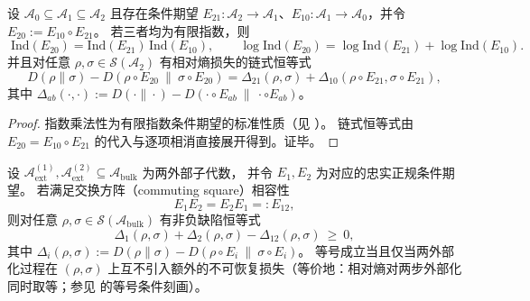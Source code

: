 

\begin{corollary}\label{cor:dephys-index-chain-rule}
设 \(\mathcal{A}_0\subseteq \mathcal{A}_1\subseteq \mathcal{A}_2\) 且存在条件期望
\(
E_{21}:\mathcal{A}_2\to\mathcal{A}_1
\)、\(
E_{10}:\mathcal{A}_1\to\mathcal{A}_0
\)，并令 \(E_{20}:=E_{10}\circ E_{21}\)。
若三者均为有限指数，则
\[
\boxed{\;
\mathrm{Ind}(E_{20})=\mathrm{Ind}(E_{21})\,\mathrm{Ind}(E_{10}),\qquad
\log\mathrm{Ind}(E_{20})=\log\mathrm{Ind}(E_{21})+\log\mathrm{Ind}(E_{10}).\;}
\]
并且对任意 \(\rho,\sigma\in\mathcal{S}(\mathcal{A}_2)\) 有相对熵损失的链式恒等式
\[
\boxed{\;
D(\rho\|\sigma)-D(\rho\circ E_{20}\ \|\ \sigma\circ E_{20})
=\Delta_{21}(\rho,\sigma)+\Delta_{10}(\rho\circ E_{21},\sigma\circ E_{21}),\;}
\]
其中 \(\Delta_{ab}(\cdot,\cdot):=D(\cdot\|\cdot)-D(\cdot\circ E_{ab}\ \|\ \cdot\circ E_{ab})\)。
\end{corollary}

\begin{proof}
指数乘法性为有限指数条件期望的标准性质（见 \cite{PimsnerPopa1986EntropyIndexSubfactors,Hiai1991MinimumIndexSubfactorsEntropyII}）。
链式恒等式由 \(E_{20}=E_{10}\circ E_{21}\) 的代入与逐项相消直接展开得到。证毕。
\end{proof}

\begin{proposition}\label{prop:dephys-commuting-square-mutual-information-defect}
设 \(\mathcal{A}_{\mathrm{ext}}^{(1)},\mathcal{A}_{\mathrm{ext}}^{(2)}\subseteq\mathcal{A}_{\mathrm{bulk}}\) 为两外部子代数，
并令 \(E_1,E_2\) 为对应的忠实正规条件期望。
若满足交换方阵（commuting square）相容性
\[
E_1E_2=E_2E_1=:E_{12},
\]
则对任意 \(\rho,\sigma\in\mathcal{S}(\mathcal{A}_{\mathrm{bulk}})\) 有非负缺陷恒等式
\begin{equation}\label{eq:dephys-mutual-information-defect}
\boxed{\;
\Delta_{1}(\rho,\sigma)+\Delta_{2}(\rho,\sigma)-\Delta_{12}(\rho,\sigma)\ \ge\ 0,\;}
\end{equation}
其中 \(\Delta_i(\rho,\sigma):=D(\rho\|\sigma)-D(\rho\circ E_i\ \|\ \sigma\circ E_i)\)。
等号成立当且仅当两外部化过程在 \((\rho,\sigma)\) 上互不引入额外的不可恢复损失（等价地：相对熵对两步外部化同时取等；参见 \cite{Petz2003MonotonicityRelativeEntropyRevisited} 的等号条件刻画）。
\end{proposition}

